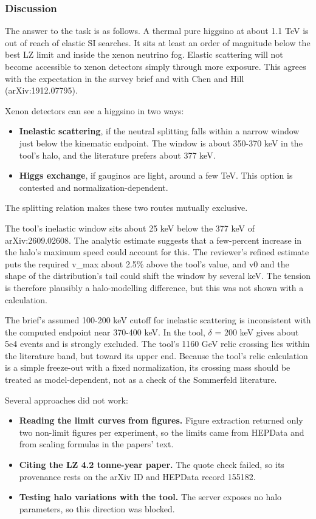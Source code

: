 \documentclass[11pt,a4paper]{article}
\begin{document}
\subsubsection*{Discussion}
The answer to the task is as follows. A thermal pure higgsino at about 1.1 TeV is out of reach of elastic SI searches. It sits at least an order of magnitude below the best LZ limit and inside the xenon neutrino fog. Elastic scattering will not become accessible to xenon detectors simply through more exposure. This agrees with the expectation in the survey brief and with Chen and Hill (arXiv:1912.07795).

Xenon detectors can see a higgsino in two ways:

\begin{itemize}
  \item \textbf{Inelastic scattering}, if the neutral splitting falls within a narrow window just below the kinematic endpoint. The window is about 350-370 keV in the tool's halo, and the literature prefers about 377 keV.
  \item \textbf{Higgs exchange}, if gauginos are light, around a few TeV. This option is contested and normalization-dependent.
\end{itemize}
The splitting relation makes these two routes mutually exclusive.

The tool's inelastic window sits about 25 keV below the 377 keV of arXiv:2609.02608. The analytic estimate suggests that a few-percent increase in the halo's maximum speed could account for this. The reviewer's refined estimate puts the required v\_max about 2.5\% above the tool's value, and v0 and the shape of the distribution's tail could shift the window by several keV. The tension is therefore plausibly a halo-modelling difference, but this was not shown with a calculation.

The brief's assumed 100-200 keV cutoff for inelastic scattering is inconsistent with the computed endpoint near 370-400 keV. In the tool, $\delta$ = 200 keV gives about 5e4 events and is strongly excluded. The tool's 1160 GeV relic crossing lies within the literature band, but toward its upper end. Because the tool's relic calculation is a simple freeze-out with a fixed normalization, its crossing mass should be treated as model-dependent, not as a check of the Sommerfeld literature.

Several approaches did not work:

\begin{itemize}
  \item \textbf{Reading the limit curves from figures.} Figure extraction returned only two non-limit figures per experiment, so the limits came from HEPData and from scaling formulas in the papers' text.
  \item \textbf{Citing the LZ 4.2 tonne-year paper.} The quote check failed, so its provenance rests on the arXiv ID and HEPData record 155182.
  \item \textbf{Testing halo variations with the tool.} The server exposes no halo parameters, so this direction was blocked.
\end{itemize}
\end{document}
